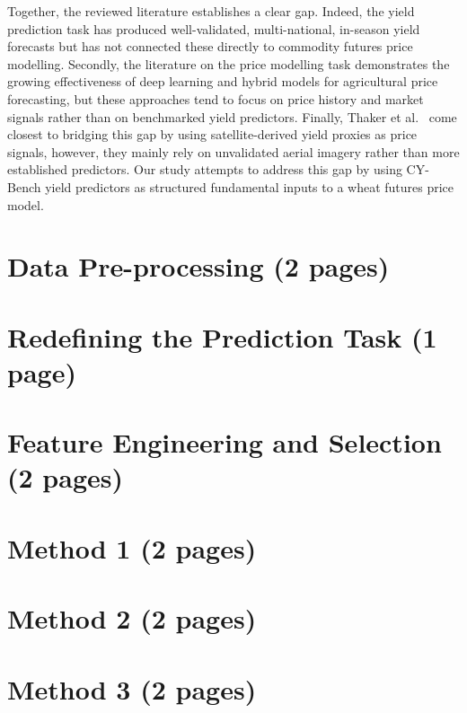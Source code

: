 \documentclass[pdflatex,sn-mathphys-num, oneside]{sn-jnl}%
\theoremstyle{thmstyleone}%
\theoremstyle{thmstyletwo}%
\theoremstyle{thmstylethree}%
\begin{document}
Together, the reviewed literature establishes a clear gap. Indeed, the yield prediction task has produced well-validated, multi-national, in-season yield forecasts but has not connected these directly to commodity futures price modelling. Secondly, the literature on the price modelling task demonstrates the growing effectiveness of deep learning and hybrid models for agricultural price forecasting, but these approaches tend to focus on price history and market signals rather than on benchmarked yield predictors. Finally, Thaker et al.~\cite{bib19} come closest to bridging this gap by using satellite-derived yield proxies as price signals, however, they mainly rely on unvalidated aerial imagery rather than more established predictors. Our study attempts to address this gap by using CY-Bench yield predictors as structured fundamental inputs to a wheat futures price model.

\clearpage

\section{Data Pre-processing (2 pages)}\label{sec3}

\clearpage

\section{Redefining the Prediction Task (1 page)}\label{sec3}

\clearpage

\section{Feature Engineering and Selection (2 pages)}\label{sec3}

\clearpage

\section{Method 1 (2 pages)}\label{sec3}

\clearpage

\section{Method 2 (2 pages)}\label{sec3}

\clearpage

\section{Method 3 (2 pages)}\label{sec3}
\end{document}
